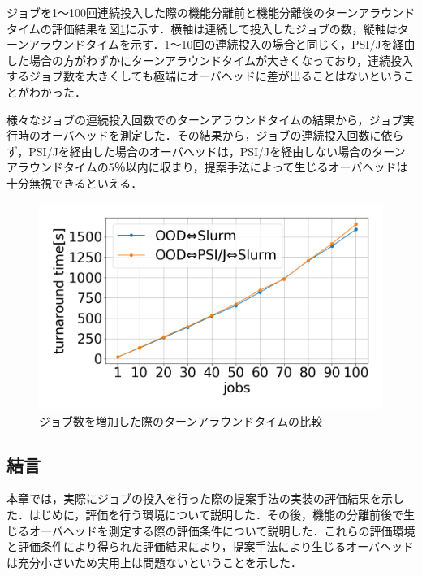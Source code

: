 ジョブを1～100回連続投入した際の機能分離前と機能分離後のターンアラウンドタイムの評価結果を図\ref{fig10}に示す．横軸は連続して投入したジョブの数，縦軸はターンアラウンドタイムを示す．1～10回の連続投入の場合と同じく，PSI/Jを経由した場合の方がわずかにターンアラウンドタイムが大きくなっており，連続投入するジョブ数を大きくしても極端にオーバヘッドに差が出ることはないということがわかった．\par
様々なジョブの連続投入回数でのターンアラウンドタイムの結果から，ジョブ実行時のオーバヘッドを測定した．その結果から，ジョブの連続投入回数に依らず，PSI/Jを経由した場合のオーバヘッドは，PSI/Jを経由しない場合のターンアラウンドタイムの5％以内に収まり，提案手法によって生じるオーバヘッドは十分無視できるといえる．\par

\begin{figure}[tb]
    \centering
    \includegraphics[width=120mm]{./fig/100jobs.png}
    \caption{ジョブ数を増加した際のターンアラウンドタイムの比較}
    \label{fig10}
\end{figure}

\subsection{結言}
本章では，実際にジョブの投入を行った際の提案手法の実装の評価結果を示した．はじめに，評価を行う環境について説明した．その後，機能の分離前後で生じるオーバヘッドを測定する際の評価条件について説明した．これらの評価環境と評価条件により得られた評価結果により，提案手法により生じるオーバヘッドは充分小さいため実用上は問題ないということを示した．\par